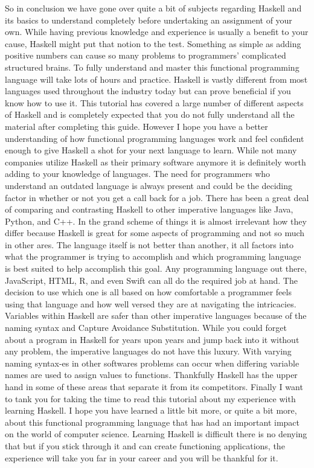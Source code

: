 \documentclass{article}
\begin{document}
So in conclusion we have gone over quite a bit of subjects regarding Haskell and its basics to understand completely before undertaking an assignment of your own. While having previous knowledge and experience is usually a benefit to your cause, Haskell might put that notion to the test. Something as simple as adding positive numbers can cause so many problems to programmers' complicated structured brains. To fully understand and master this functional programming language will take lots of hours and practice. Haskell is vastly different from most languages used throughout the industry today but can prove beneficial if you know how to use it. This tutorial has covered a large number of different aspects of Haskell and is completely expected that you do not fully understand all the material after completing this guide. However I hope you have a better understanding of how functional programming languages work and feel confident enough to give Haskell a shot for your next language to learn. While not many companies utilize Haskell as their primary software anymore it is definitely worth adding to your knowledge of languages. The need for programmers who understand an outdated language is always present and could be the deciding factor in whether or not you get a call back for a job. There has been a great deal of comparing and contrasting Haskell to other imperative languages like Java, Python, and C++. In the grand scheme of things it is almost irrelevant how they differ because Haskell is great for some aspects of programming and not so much in other ares. The language itself is not better than another, it all factors into what the programmer is trying to accomplish and which programming language is best suited to help accomplish this goal. Any programming language out there, JavaScript, HTML, R, and even Swift can all do the required job at hand. The decision to use which one is all based on how comfortable a programmer feels using that language and how well versed they are at navigating the intricacies. Variables within Haskell are safer than other imperative languages because of the naming syntax and Capture Avoidance Substitution. While you could forget about a program in Haskell for years upon years and jump back into it without any problem, the imperative languages do not have this luxury. With varying naming syntax-es in other softwares problems can occur when differing variable names are used to assign values to functions. Thankfully Haskell has the upper hand in some of these areas that separate it from its competitors. Finally I want to tank you for taking the time to read this tutorial about my experience with learning Haskell. I hope you have learned a little bit more, or quite a bit more, about this functional programming language that has had an important impact on the world of computer science. Learning Haskell is difficult there is no denying that but if you stick through it and can create functioning applications, the experience will take you far in your career and you will be thankful for it.
\end{document}
